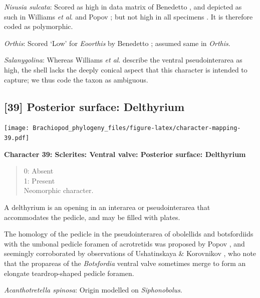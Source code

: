 \documentclass[openany]{book}
\theoremstyle{definition}
\theoremstyle{definition}
\theoremstyle{definition}
\theoremstyle{remark}
\begin{document}
\hypertarget{Nisusia_sulcata-coding-38}{}
\emph{Nisusia sulcata}: Scored as high in data matrix of Benedetto
\citeyearpar{Benedetto2009iChaniella}, and depicted as such in Williams
\emph{et al}. \citeyearpar[fig.
125]{Williams2000LinguliformeaCraniiformea} and Popov \citeyearpar[fig.
1]{Popov1992TheCambrian}; but not high in all specimens
\citep[e.g.][fig. 126]{Williams2000LinguliformeaCraniiformea}. It is
therefore coded as polymorphic.

\hypertarget{Orthis-coding-38}{}
\emph{Orthis}: Scored `Low' for \emph{Eoorthis} by Benedetto
\citeyearpar{Benedetto2009iChaniella}; assumed same in \emph{Orthis}.

\hypertarget{Salanygolina-coding-38}{}
\emph{Salanygolina}: Whereas Williams \emph{et al}.
\citeyearpar[p.~156]{Williams2000LinguliformeaCraniiformea} describe the
ventral pseudointerarea as high, the shell lacks the deeply conical
aspect that this character is intended to capture; we thus code the
taxon as ambiguous.

\subsection*{{[}39{]} Posterior surface:
Delthyrium}\label{posterior-surface-delthyrium}

\texttt{[image: Brachiopod\_phylogeny\_files/figure-latex/character-mapping-39.pdf]}

\textbf{Character 39: Sclerites: Ventral valve: Posterior surface:
Delthyrium}

\begin{quote}
0: Absent\\
1: Present\\
Neomorphic character.
\end{quote}

A delthyrium is an opening in an interarea or pseudointerarea that
accommodates the pedicle, and may be filled with plates.

The homology of the pedicle in the pseudointerarea of obolellids and
botsfordiids with the umbonal pedicle foramen of acrotretids was
proposed by Popov \citeyearpar{Popov1992TheCambrian}, and seemingly
corroborated by observations of Ushatinskaya \& Korovnikov
\citeyearpar{Ushatinskaya2016Revisionof}, who note that the propareas of
the \emph{Botsfordia} ventral valve sometimes merge to form an elongate
teardrop-shaped pedicle foramen.

\hypertarget{Acanthotretella_spinosa-coding-39}{}
\emph{Acanthotretella spinosa}: Origin modelled on \emph{Siphonobolus}.
\end{document}
